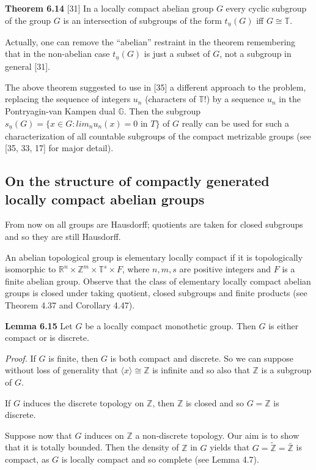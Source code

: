 \documentclass[12pt]{article}
\begin{document}
\begin{itemize}
\begin{itemize}
\textbf{Theorem 6.14} [31] In a locally compact abelian group $G$ every cyclic subgroup of the group $G$ is an intersection
of subgroups of the form $t_{\underline{u}}(G)$ iff $G \cong \mathbb{T}$.


    Actually, one can remove the “abelian” restraint in the theorem remembering that in the non-abelian case
$t_{\underline{u}}(G)$ is just a subset of $G$, not a subgroup in general [31].


    The above theorem suggested to use in [35] a different approach to the problem, replacing the sequence of
integers $u_n$ (characters of $\mathbb{T}!$) by a sequence $u_n$ in the Pontryagin-van Kampen dual $\mathbb{G}$. Then the subgroup
$s_{\underline{u}}(G) = \{x \in G : lim_n u_n (x) = 0 \text{ in } T\}$ of $G$ really can be used for such a characterization of all countable
subgroups of the compact metrizable groups (see [35, 33, 17] for major detail).


\subsection{On the structure of compactly generated locally compact abelian groups}
From now on all groups are Hausdorff; quotients are taken for closed subgroups and so they are still Hausdorff.


    An abelian topological group is elementary locally compact if it is topologically isomorphic to $\mathbb{R}^n \times \mathbb{Z}^m \times \mathbb{T}^s \times F$,
where $n, m, s$ are positive integers and $F$ is a finite abelian group. Observe that the class of elementary locally
compact abelian groups is closed under taking quotient, closed subgroups and finite products (see Theorem 4.37
and Corollary 4.47).


\textbf{Lemma 6.15} Let $G$ be a locally compact monothetic group. Then $G$ is either compact or is discrete.


    \emph{Proof.} If $G$ is finite, then $G$ is both compact and discrete. So we can suppose without loss of generality that
$\langle x \rangle \cong \mathbb{Z}$ is infinite and so also that $\mathbb{Z}$ is a subgroup of $G$.


    If $G$ induces the discrete topology on $\mathbb{Z}$, then $\mathbb{Z}$ is closed and so $G = \mathbb{Z}$ is discrete.


    Suppose now that $G$ induces on $\mathbb{Z}$ a non-discrete topology. Our aim is to show that it is totally bounded.
Then the density of $\mathbb{Z}$ in $G$ yields that $G = \tilde{\mathbb{Z}} = \bar{\mathbb{Z}}$ is compact, as $G$ is locally compact and so complete (see
Lemma 4.7).



\end{itemize}
\end{itemize}
\end{document}
